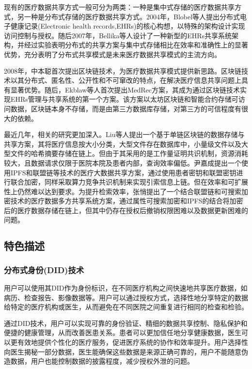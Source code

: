 \documentclass{cumcmthesis}
\numberwithin{equation}{section} %
\numberwithin{figure}{section} %
\numberwithin{table}{section} %
\begin{document}
现有的医疗数据共享方式一般可分为两类：一种是集中式存储的医疗数据共享方式，另一种是分布式存储的医疗数据共享方式。2004年，Blobel等人\cite{ref2}提出分布式电子健康记录(Electronic health records,EHRs)的核心构想，以特殊的架构设计实现访问控制与授权。随后2007年，Bellika等人\cite{ref3}设计了一种新型的EHRs共享系统架构，并经过实验表明分布式的共享方案与集中式存储相比在效率和准确性上的显著优势，充分表明了分布式共享模式是未来医疗数据共享模式的主流方向。

2008年，中本聪\cite{ref4}首次提出区块链技术，为医疗数据共享模式提供新思路。区块链技术以其分布式、匿名性、公开性和不可窜改的特点，在解决医疗信息共享问题上具有显著优势。随后，Ekblaw等人\cite{ref5}首次提出MedRec方案，其成为通过区块链技术实现EHRs管理与共享系统的第一个方案。该方案以太坊区块链和智能合约存储可访问数据，区块链本身不存储，而是由第三方数据库存储，对第三方的可信程度有很大的依赖。

最近几年，相关的研究更加深入。Liu等人\cite{ref6}提出一个基于单链区块链的数据存储与共享方案，其将医疗信息按大小分类，大型文件存在数据库中，小量级文件以及大型文件的哈希摘要存储在链上。但由于其采用的是工作量证明共识机制，资源消耗较大，且数据请求仅限于医院本院及患者内部，查询效率偏低。尹嘉成\cite{ref7}提出一个使用IPFS和联盟链等技术的医疗大数据共享方案，通过使用患者密钥和联盟密钥进行联合加密，同样采取算力竞争共识机制来实现引索信息上链。但在效率和可扩展性上仍然难以达到要求。为提升检索效率，张悄\cite{ref8}提出了一个结合联盟链和可搜索加密技术的医疗数据多方共享系统方案，通过属性可搜索加密和IPFS的结合将加密后的医疗数据存储在链上，但其中仍存在授权后撤销权限困难以及数据更新困难的问题。

\subsection{特色描述}

\subsubsection{分布式身份(DID)技术}

用户可以使用其DID作为身份标识，在不同医疗机构之间快速地共享医疗数据，如病历、检查报告、影像数据等。用户可以通过授权方式，选择性地分享特定的数据给特定的医疗机构或医生，从而避免在不同医院之间重复进行相同的检查和检验。

通过DID技术，用户可以实现可靠的身份验证、精细的数据共享控制、隐私保护和便捷的健康管理，从而改善医患关系。患者可以更加信任地分享健康数据，医生可以更有效地提供个性化的医疗服务，促进医疗系统的协作和效率提升。用户选择性向医生揭秘一部分数据，医生能确保这些数据是来源正确可靠的，用户不能随意伪造数据，用户也能控制数据的披露程度，减少授权外泄的问题。
\end{document}
